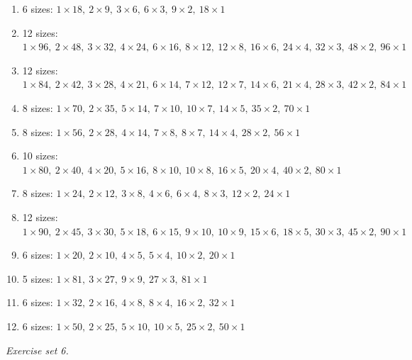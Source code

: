 \begin{enumerate}[label=\arabic*., leftmargin=*, itemsep=1pt]
\item 6 sizes: $1\times18,\ 2\times9,\ 3\times6,\ 6\times3,\ 9\times2,\ 18\times1$
\item 12 sizes: $1\times96,\ 2\times48,\ 3\times32,\ 4\times24,\ 6\times16,\ 8\times12,\ 12\times8,\ 16\times6,\ 24\times4,\ 32\times3,\ 48\times2,\ 96\times1$
\item 12 sizes: $1\times84,\ 2\times42,\ 3\times28,\ 4\times21,\ 6\times14,\ 7\times12,\ 12\times7,\ 14\times6,\ 21\times4,\ 28\times3,\ 42\times2,\ 84\times1$
\item 8 sizes: $1\times70,\ 2\times35,\ 5\times14,\ 7\times10,\ 10\times7,\ 14\times5,\ 35\times2,\ 70\times1$
\item 8 sizes: $1\times56,\ 2\times28,\ 4\times14,\ 7\times8,\ 8\times7,\ 14\times4,\ 28\times2,\ 56\times1$
\item 10 sizes: $1\times80,\ 2\times40,\ 4\times20,\ 5\times16,\ 8\times10,\ 10\times8,\ 16\times5,\ 20\times4,\ 40\times2,\ 80\times1$
\item 8 sizes: $1\times24,\ 2\times12,\ 3\times8,\ 4\times6,\ 6\times4,\ 8\times3,\ 12\times2,\ 24\times1$
\item 12 sizes: $1\times90,\ 2\times45,\ 3\times30,\ 5\times18,\ 6\times15,\ 9\times10,\ 10\times9,\ 15\times6,\ 18\times5,\ 30\times3,\ 45\times2,\ 90\times1$
\item 6 sizes: $1\times20,\ 2\times10,\ 4\times5,\ 5\times4,\ 10\times2,\ 20\times1$
\item 5 sizes: $1\times81,\ 3\times27,\ 9\times9,\ 27\times3,\ 81\times1$
\item 6 sizes: $1\times32,\ 2\times16,\ 4\times8,\ 8\times4,\ 16\times2,\ 32\times1$
\item 6 sizes: $1\times50,\ 2\times25,\ 5\times10,\ 10\times5,\ 25\times2,\ 50\times1$
\end{enumerate}
\par\noindent\emph{Exercise set 6.}\nopagebreak
